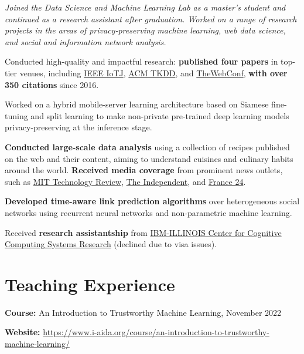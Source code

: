 \documentclass[11pt]{article}
\begin{document}
\textit{Joined the {Data Science and Machine Learning Lab} as a master's student and continued as a research assistant after graduation. Worked on a range of research projects in the areas of privacy-preserving machine learning, web data science, and social and information network analysis.}
  \begin{innerlist}
    \item Conducted high-quality and impactful research: \textbf{published four papers} in top-tier venues, including \href{https://ieee-iotj.org/}{IEEE IoTJ}, \href{https://dl.acm.org/journal/tkdd}{ACM TKDD}, and \href{https://thewebconf.org/www2017/}{TheWebConf}, \textbf{with over 350 citations} since 2016.
    \item Worked on a hybrid mobile-server learning architecture based on Siamese fine-tuning and split learning to make non-private pre-trained deep learning models privacy-preserving at the inference stage.
    \item \textbf{Conducted large-scale data analysis} using a collection of recipes published on the web and their content, aiming to understand cuisines and culinary habits around the world. \textbf{Received media coverage} from prominent news outlets, such as \href{https://www.technologyreview.com/s/602790/how-data-mining-reveals-the-worlds-healthiest-cuisines/}{MIT Technology Review}, \href{https://www.indy100.com/article/healthy-diverse-top-healthiest-countries-cuisine-food-in-the-world-list-7412171}{The Independent}, and \href{https://www.france24.com/fr/20161115-algorithme-compare-cuisines-monde-matiere-dingredients-dapports-nutritionnels}{France 24}.
    \item \textbf{Developed time-aware link prediction algorithms} over heterogeneous social networks using recurrent neural networks and non-parametric machine learning.
    \item Received \textbf{research assistantship} from
    \href{https://www.c3sr.com/}{IBM-ILLINOIS Center for Cognitive Computing Systems Research} (declined due to visa issues).\\
  \end{innerlist}

\section{Teaching Experience}

\begin{innerlist}
  \item[] \textbf{Course:} An Introduction to Trustworthy Machine Learning, {November 2022}
  \item[] \textbf{Website:} \href{https://www.i-aida.org/course/an-introduction-to-trustworthy-machine-learning/}{https://www.i-aida.org/course/an-introduction-to-trustworthy-machine-learning/}
\end{innerlist}
\end{document}
